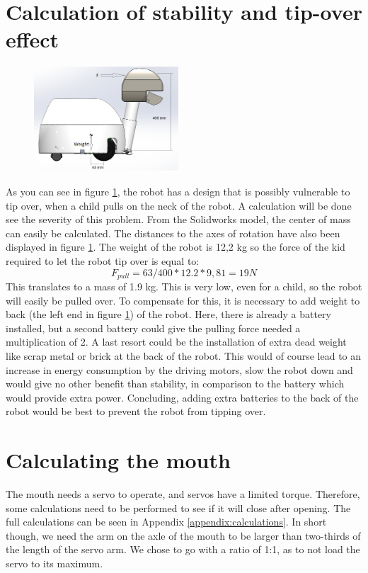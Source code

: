\documentclass[11pt,twoside,a4paper]{report}
\begin{document}
\section{Calculation of stability and tip-over effect}
\begin{figure}
  \begin{center}
    \includegraphics[width=0.48\textwidth]{Images/Weight.png}
  \end{center}
  \caption{ }
  \label{figure:weigth}
\end{figure}
As you can see in figure \ref{figure:weigth}, the robot has a design that is possibly vulnerable to tip over, when a child pulls on the neck of the robot. A calculation will be done see the severity of this problem. From the Solidworks model, the center of mass can easily be calculated. The distances to the axes of rotation have also been displayed in figure \ref{figure:weigth}. The weight of the robot is 12,2 kg so the force of the kid required to let the robot tip over is equal to:
\[F_{pull} = 63/400 *12.2*9,81 = 19 N \]  
This translates to a mass of 1.9 kg. This is very low, even for a child, so the robot will easily be pulled over. To compensate for this, it is necessary to add weight to back (the left end in figure \ref{figure:weigth}) of the robot. Here, there is already a battery installed, but a second battery could give the pulling force needed a multiplication of 2. A last resort could be the installation of extra dead weight like scrap metal or brick at the back of the robot. This would of course lead to an increase in energy consumption by the driving motors, slow the robot down and would give no other benefit than stability, in comparison to the battery which would provide extra power. Concluding, adding extra batteries to the back of the robot would be best to prevent the robot from tipping over.

\section{Calculating the mouth}
The mouth needs a servo to operate, and servos have a limited torque. Therefore, some calculations need to be performed to see if it will close after opening. 
The full calculations can be seen in Appendix \ref{appendix:calculations}. In short though, we need the arm on the axle of the mouth to be larger than two-thirds of the length of the servo arm. We chose to go with a ratio of 1:1, as to not load the servo to its maximum.
\end{document}
